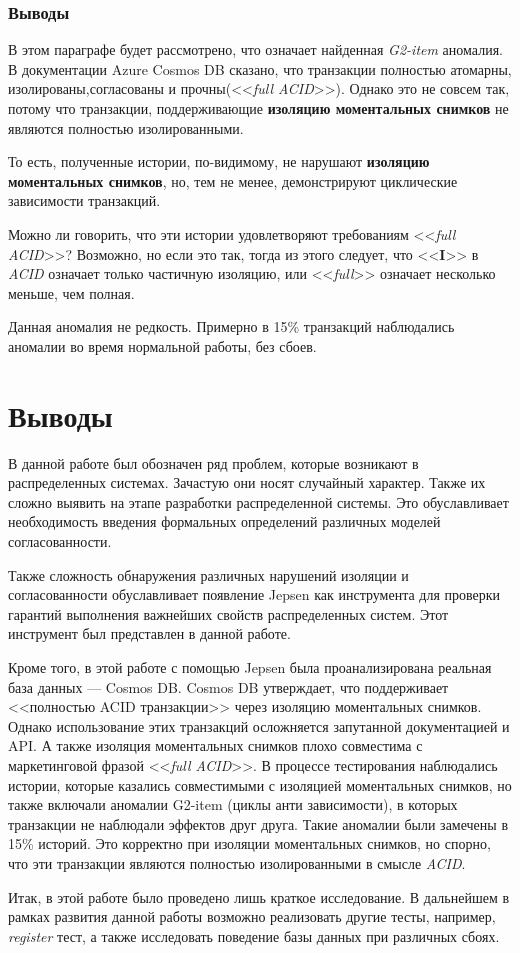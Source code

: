 \documentclass[12pt,  openany]{book}
\begin{document}
\subsection{Выводы}
В этом параграфе будет рассмотрено, что означает найденная \textit{G2-item} аномалия. В документации Azure Cosmos DB сказано, что транзакции полностью атомарны, изолированы,согласованы и прочны(<<\textit{full ACID}>>).  Однако это не совсем так, потому что транзакции, поддерживающие \textbf{изоляцию моментальных снимков} не являются полностью изолированными. 
\par
То есть, полученные  истории, по-видимому, не нарушают \textbf{изоляцию моментальных снимков}, но, тем не менее, демонстрируют циклические зависимости транзакций.
\par
Можно ли говорить, что эти истории удовлетворяют требованиям <<\textit{full ACID}>>? Возможно, но если это так, тогда из этого следует, что <<\textbf{I}>> в \textit{ACID} означает только частичную изоляцию, или <<\textit{full}>> означает несколько меньше, чем полная.
\par
Данная аномалия не редкость. Примерно в 15\% транзакций наблюдались аномалии во время нормальной работы, без сбоев.


\chapter{Выводы}
В данной работе был обозначен ряд проблем, которые возникают в распределенных системах. Зачастую они носят случайный характер. Также их сложно выявить на этапе разработки распределенной системы.  Это обуславливает необходимость введения формальных определений различных моделей согласованности.
\par Также сложность обнаружения различных нарушений изоляции и согласованности обуславливает появление Jepsen как инструмента для проверки гарантий выполнения важнейших свойств распределенных систем. Этот инструмент был представлен в данной работе.
\par Кроме того, в этой работе с помощью Jepsen была проанализирована реальная база данных --- Cosmos DB.  Cosmos DB утверждает, что поддерживает  <<полностью ACID транзакции>> через изоляцию моментальных снимков. Однако использование этих транзакций осложняется запутанной документацией и API.  А также изоляция моментальных снимков плохо совместима с маркетинговой фразой <<\textit{full ACID}>>.  В процессе тестирования наблюдались истории, которые казались совместимыми с изоляцией моментальных снимков, но также включали аномалии G2-item (циклы анти зависимости), в которых транзакции не наблюдали эффектов друг друга.  Такие аномалии были замечены в 15\% историй. Это корректно при изоляции моментальных снимков, но спорно, что эти транзакции являются полностью изолированными  в смысле \textit{ACID}.
\par Итак, в этой работе было проведено лишь краткое исследование. В дальнейшем в рамках развития данной работы возможно реализовать другие тесты, например, \textit{register} тест, а также исследовать поведение базы данных при различных сбоях.




\end{document}
